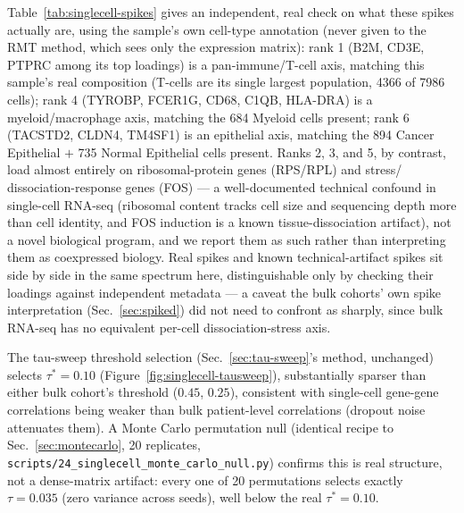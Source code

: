 \documentclass[11pt]{article}
\begin{document}
Table~\ref{tab:singlecell-spikes} gives an independent, real check on
what these spikes actually are, using the sample's own cell-type
annotation (never given to the RMT method, which sees only the
expression matrix): rank 1 (B2M, CD3E, PTPRC among its top loadings) is
a pan-immune/T-cell axis, matching this sample's real composition
(T-cells are its single largest population, 4366 of 7986 cells); rank 4
(TYROBP, FCER1G, CD68, C1QB, HLA-DRA) is a myeloid/macrophage axis,
matching the 684 Myeloid cells present; rank 6 (TACSTD2, CLDN4, TM4SF1)
is an epithelial axis, matching the 894 Cancer Epithelial $+$ 735
Normal Epithelial cells present. Ranks 2, 3, and 5, by contrast, load
almost entirely on ribosomal-protein genes (RPS/RPL) and stress/
dissociation-response genes (FOS) --- a well-documented technical
confound in single-cell RNA-seq (ribosomal content tracks cell size and
sequencing depth more than cell identity, and FOS induction is a known
tissue-dissociation artifact), not a novel biological program, and we
report them as such rather than interpreting them as coexpressed
biology. Real spikes and known technical-artifact spikes sit side by
side in the same spectrum here, distinguishable only by checking their
loadings against independent metadata --- a caveat the bulk cohorts'
own spike interpretation (Sec.~\ref{sec:spiked}) did not need to
confront as sharply, since bulk RNA-seq has no equivalent per-cell
dissociation-stress axis.

The tau-sweep threshold selection (Sec.~\ref{sec:tau-sweep}'s method,
unchanged) selects $\tau^*=0.10$ (Figure~\ref{fig:singlecell-tausweep}),
substantially sparser than either bulk cohort's threshold ($0.45$,
$0.25$), consistent with single-cell gene-gene correlations being
weaker than bulk patient-level correlations (dropout noise attenuates
them). A Monte Carlo permutation null (identical recipe to
Sec.~\ref{sec:montecarlo}, 20 replicates,
\texttt{scripts/24\_singlecell\_monte\_carlo\_null.py}) confirms this is
real structure, not a dense-matrix artifact: every one of 20
permutations selects exactly $\tau=0.035$ (zero variance across
seeds), well below the real $\tau^*=0.10$.
\end{document}
